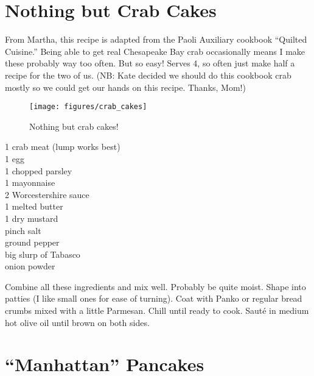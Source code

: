 \section{Nothing but Crab Cakes
}

\begin{open}
From Martha, this recipe is adapted from the Paoli Auxiliary cookbook ``Quilted Cuisine.'' Being able to get real Chesapeake Bay crab occasionally means I make these probably way too often. But so easy! Serves 4, so often just make half a recipe for the two of us. (NB: Kate decided we should do this cookbook crab mostly so we could get our hands on this recipe. Thanks, Mom!)
\end{open}
\begin{figure}[h]
    \centering
    \texttt{[image: figures/crab\_cakes]}
    \caption*{Nothing but crab cakes!}
\end{figure}
\begin{ingredients}
    \SI{1}{\pound} crab meat (lump works best)\\
    1 egg\\
    \SI{1}{\tblspoon} chopped parsley\\
    \SI{1}{\tblspoon} mayonnaise\\
    \SI{2}{\teaspoon} Worcestershire sauce\\
    \SI{1}{\tblspoon} melted butter\\
    \SI{1}{\teaspoon} dry mustard \\
    pinch salt\\
    ground pepper\\
    big slurp of Tabasco\\
    onion powder
\end{ingredients}
Combine all these ingredients and mix well. Probably be quite moist. Shape into patties (I like small ones for ease of turning). Coat with Panko or regular bread crumbs mixed with a little Parmesan. Chill until ready to cook. Sauté in medium hot olive oil until brown on both sides.

\section{``Manhattan'' Pancakes}

